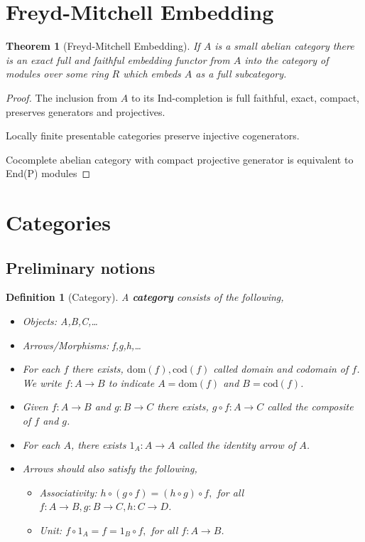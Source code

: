 \documentclass[12pt]{article}
\numberwithin{equation}{section}
\newtheorem{theorem}{Theorem}[section]
\newtheorem{definition}{Definition}[section]
\begin{document}
	\section{Freyd-Mitchell Embedding}
	\begin{theorem}[Freyd-Mitchell Embedding]
		If $A$ is a small abelian category there is an exact full and faithful embedding functor from $A$ into the category of modules over some ring $R$ which embeds $A$ as a full subcategory.
	\end{theorem}
	\begin{proof}
		The inclusion from $A$ to its Ind-completion is full faithful, exact, compact, preserves generators and projectives.
		
		Locally finite presentable categories preserve injective cogenerators.
		
		Cocomplete abelian category with compact projective	generator is equivalent to End(P) modules
	\end{proof}
	
	\appendix
	\section{Categories}
	\subsection{Preliminary notions}
 	\begin{definition}[Category]
 		A \textbf{category} consists of the following,
 		\begin{itemize}
 			\item Objects: A,B,C,\dots
 			\item Arrows/Morphisms: f,g,h,\dots
 			\item For each $ f $ there exists, $ \mathrm{dom}(f) , \mathrm{cod}(f)$ called domain and codomain of $ f $. We write $ f: A \to B $ to indicate $ A=\mathrm{dom}(f) $ and $ B=\mathrm{cod}(f) $.
 			\item Given  $ f: A \to B$ and $ g: B \to C $ there exists, $ g \circ f: A \to C $ called the \textit{composite} of $ f $ and $ g $.
 			\item For each $ A $, there exists $ 1_A:A\to A $ called the \textit{identity arrow} of $ A $.
 			\item Arrows should also satisfy the following,
 			\begin{itemize}
 				\item Associativity: $ h \circ(g \circ f) = (h \circ g) \circ f,$ for all $ f:A \to B, g:B \to C, h: C \to D $.
 				\item Unit: $ f\circ 1_A=f=1_B\circ f, $ for all $ f:A \to B $.	
 			\end{itemize}
 		\end{itemize}
 	\end{definition}
	
\end{document}
